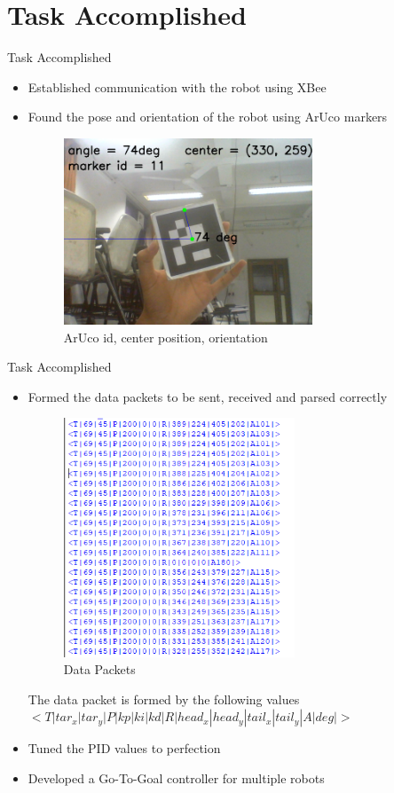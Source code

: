 \documentclass[10pt,a4paper]{beamer}
\begin{document}
\section{Task Accomplished}
\begin{frame}{Task Accomplished}
\begin{itemize}
\item Established communication with the robot using XBee\pause
\item Found the pose and orientation of the robot using ArUco markers
\begin{figure}
\includegraphics[height=0.6\textheight, width=0.7\textwidth]{image_screenshot2.png}\caption{ArUco id, center position, orientation}
\end{figure}
\end{itemize}
\end{frame}
\begin{frame}{Task Accomplished}
\begin{itemize}
\item Formed the data packets to be sent, received and parsed correctly\pause
\begin{figure}
\includegraphics[height=0.45\textheight, width=0.65\textwidth]{capture.png}\caption{Data Packets}
\end{figure}
\small{The data packet is formed by the following values}
\small{$<T|tar_x|tar_y|P|kp|ki|kd|R|head_x|head_y|tail_x|tail_y|A|deg|>$}\pause
\item Tuned the PID values to perfection\pause
\item Developed a Go-To-Goal controller for multiple robots
\end{itemize}
\end{frame}
\end{document}
